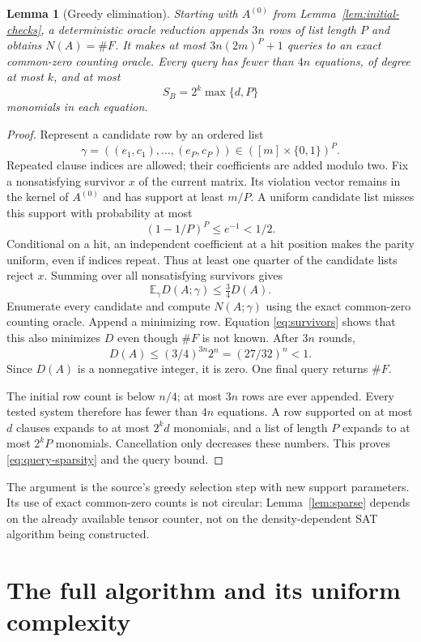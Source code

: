 \documentclass[11pt]{article}
\numberwithin{equation}{section}
\newtheorem{lemma}[theorem]{Lemma}
\theoremstyle{definition}\newtheorem{definition}[theorem]{Definition}
\theoremstyle{remark}\newtheorem{remark}[theorem]{Remark}
\begin{document}
\begin{lemma}[Greedy elimination]\label{lem:greedy}
Starting with $A^{(0)}$ from Lemma~\ref{lem:initial-checks}, a
deterministic oracle reduction appends $3n$ rows of list length $P$
and obtains $N(A)=\#F$. It makes at most $3n(2m)^P+1$ queries to
an exact common-zero counting oracle. Every query has fewer than $4n$ equations, of
degree at most $k$, and at most
\begin{equation}\label{eq:query-sparsity}
 S_B=2^k\max\{d,P\}
\end{equation}
monomials in each equation.
\end{lemma}
\begin{proof}
Represent a candidate row by an ordered list
\[
 \gamma=((e_1,c_1),\ldots,(e_P,c_P))
       \in([m]\times\{0,1\})^P.
\]
Repeated clause indices are allowed; their coefficients are added
modulo two. Fix a nonsatisfying survivor $x$ of the current matrix.
Its violation vector remains in the kernel of $A^{(0)}$ and has
support at least $m/P$. A uniform candidate list misses this support
with probability at most
\[
 (1-1/P)^P\le e^{-1}<1/2.
\]
Conditional on a hit, an independent coefficient at a hit position
makes the parity uniform, even if indices repeat. Thus at least
one quarter of the candidate lists reject $x$. Summing over all
nonsatisfying survivors gives
\[
 \mathbb E_\gamma D(A;\gamma)\le\tfrac34D(A).
\]
Enumerate every candidate and compute $N(A;\gamma)$ using the
exact common-zero counting oracle. Append a minimizing row. Equation
\eqref{eq:survivors} shows that this also minimizes $D$ even though
$\#F$ is not known. After $3n$ rounds,
\[
 D(A)\le(3/4)^{3n}2^n=(27/32)^n<1.
\]
Since $D(A)$ is a nonnegative integer, it is zero. One final query
returns $\#F$.

The initial row count is below $n/4$; at most $3n$ rows are ever
appended. Every tested system therefore has fewer than $4n$
equations. A row supported on at most $d$ clauses expands to at
most $2^kd$ monomials, and a list of length $P$ expands to at most
$2^kP$ monomials. Cancellation only decreases these numbers.
This proves \eqref{eq:query-sparsity} and the query bound.
\end{proof}

The argument is the source's greedy selection step with new support
parameters. Its use of exact common-zero counts is not circular:
Lemma~\ref{lem:sparse} depends on the already available tensor
counter, not on the density-dependent SAT algorithm being constructed.

\section{The full algorithm and its uniform complexity}
\label{sec:algorithm}
\end{document}
